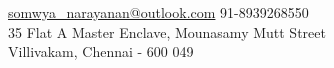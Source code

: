 
\nobreakvspace{0.3em}  %


\noindent\href{mailto:sowmya_narayanan@outlook.com}{somwya\_narayanan\mbox{}@\mbox{}outlook.com}\sbull
\textsmaller{+}91-8939268550
\\
35 Flat A Master Enclave, Mounasamy Mutt Street 
\\
Villivakam, Chennai - 600 049